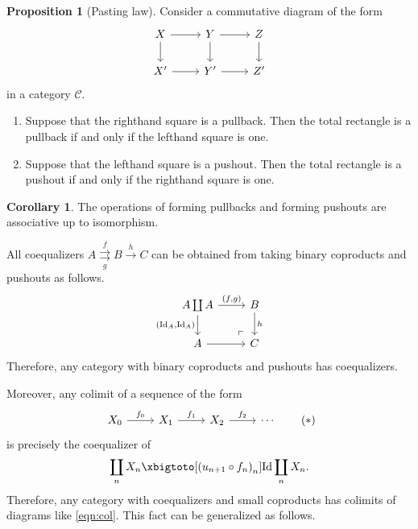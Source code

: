 \documentclass[10pt,letterpaper,cm]{nupset}
\theoremstyle{definition}
\theoremstyle{theorem}
\newtheorem{corollary}[definition]{Corollary}
\newtheorem{prop}[definition]{Proposition}
\theoremstyle{remark}
\newcommand{\1}{\mathbf{1}}
\renewcommand{\c}{\mathscr{C}}
\newcommand{\0}{\vec 0}
\DeclareMathOperator{\id}{Id}
\begin{document}
\begin{prop}[Pasting law]
Consider a commutative diagram of the form
\[
\begin{tikzcd}
X \arrow[d] \arrow[r] & Y \arrow[r] \arrow[d] & Z \arrow[d] \\
X' \arrow[r]          & Y' \arrow[r]          & Z'         
\end{tikzcd}
\] in a category $\c$.
\begin{enumerate}
\item Suppose that the righthand square is a pullback. Then the total rectangle is a pullback if and only if the lefthand square is one.
\item Suppose that the lefthand square is a pushout. Then the total rectangle is a pushout if and only if the righthand square is one. 
\end{enumerate}
\end{prop}

\begin{corollary}
The operations of forming pullbacks and forming pushouts are associative up to isomorphism.
\end{corollary}

\medskip

All coequalizers $A \overset{f}{\underset{g}{\rightrightarrows}} B \overset{h}{\longrightarrow} C$ can be obtained from taking binary coproducts and pushouts as follows.
\[
\begin{tikzcd}
A\coprod A \arrow[d, "{\left(\id_A, \id_A\right)}"']
 \arrow[dr, phantom, "\ulcorner", very near end]
 \arrow[r, "{\left(f,g\right)}"] & B \arrow[d, "h"] \\
A \arrow[r]                                                                      & C               
\end{tikzcd}
\] Therefore, any category with binary coproducts and pushouts has coequalizers.

   {\bigRelbar\bigRelbar{\bigtwoarrowsleft\rightarrow\rightarrow}}

Moreover, any colimit of a sequence of the form
\[ \label{eqn:col}
\begin{tikzcd}
X_0 \arrow[r, "f_0"] & X_1 \arrow[r, "f_1"] & X_2 \arrow[r, "f_2"] & \cdots
\end{tikzcd} \tag{$\ast$}
\] is precisely the coequalizer of
\[
\coprod_nX_n \xbigtoto[\left(u_{n+1}\circ f_n\right)_n]{\id} \coprod_nX_n.
\] Therefore, any category with coequalizers and small coproducts has colimits of diagrams like \eqref{eqn:col}. This fact can be generalized as follows.
\end{document}
